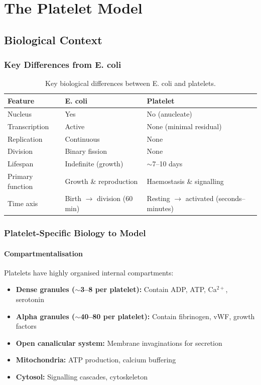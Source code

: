 \documentclass[11pt,a4paper]{report}
\begin{document}
\part{The Platelet Model}

\chapter{Biological Context}

\section{Key Differences from E. coli}

\begin{table}[h]
\centering
\begin{tabular}{lll}
\toprule
\textbf{Feature} & \textbf{E. coli} & \textbf{Platelet} \\
\midrule
Nucleus & Yes & No (anucleate) \\
Transcription & Active & None (minimal residual) \\
Replication & Continuous & None \\
Division & Binary fission & None \\
Lifespan & Indefinite (growth) & $\sim$7--10 days \\
Primary function & Growth \& reproduction & Haemostasis \& signalling \\
Time axis & Birth $\to$ division (60 min) & Resting $\to$ activated (seconds--minutes) \\
\bottomrule
\end{tabular}
\caption{Key biological differences between E. coli and platelets.}
\end{table}

\section{Platelet-Specific Biology to Model}

\subsection{Compartmentalisation}

Platelets have highly organised internal compartments:

\begin{itemize}
    \item \textbf{Dense granules ($\sim$3--8 per platelet):} Contain ADP, ATP, Ca$^{2+}$, serotonin
    \item \textbf{Alpha granules ($\sim$40--80 per platelet):} Contain fibrinogen, vWF, growth factors
    \item \textbf{Open canalicular system:} Membrane invaginations for secretion
    \item \textbf{Mitochondria:} ATP production, calcium buffering
    \item \textbf{Cytosol:} Signalling cascades, cytoskeleton
\end{itemize}
\end{document}

